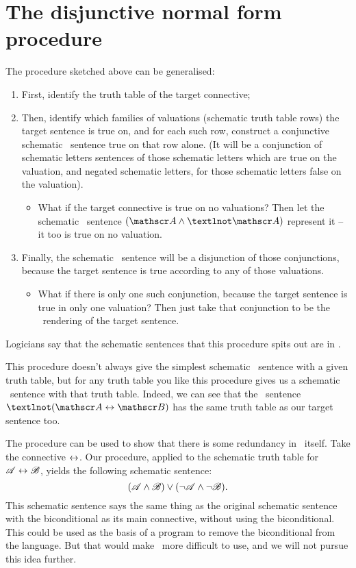 \section{The disjunctive normal form procedure}


The procedure sketched above can be generalised: \begin{enumerate}
	\item First, identify the truth table of the target connective;
	\item Then, identify which families of valuations (schematic truth table rows) the target sentence is true on, and for each such row, construct a conjunctive schematic \TFL\ sentence true on that row alone. (It will be a conjunction of schematic letters sentences of those schematic letters which are true on the valuation, and negated schematic letters, for those schematic letters false on the valuation). \begin{itemize}
		\item What if the target connective is true on no valuations? Then let the schematic \TFL\ sentence $(\meta{A} \wedge ¬\meta{A})$ represent it – it too is true on no valuation.
	\end{itemize}
	\item Finally, the schematic \TFL\ sentence will be a disjunction of those conjunctions, because the target sentence is true according to any of those valuations. \begin{itemize}
		\item What if there is only one such conjunction, because the target sentence is true in only one valuation? Then just take that conjunction to be the \TFL\ rendering of the target sentence.
	\end{itemize}
\end{enumerate}  
Logicians say that the schematic sentences that this procedure spits out are in .


This procedure doesn't always give the simplest schematic \TFL\ sentence with a given truth table, but for any truth table you like this procedure gives us a schematic \TFL\ sentence with that truth table. Indeed, we can see that the \TFL\ sentence $¬(\meta{A} \eiff \meta{B})$ has the same truth table as our target sentence too.

The procedure can be used to show that there is some redundancy in \TFL\ itself. Take the connective $\leftrightarrow$. Our procedure, applied to the schematic truth table for $\mathscr{A}\leftrightarrow\mathscr{B}$, yields the following schematic sentence: \[(\mathscr{A}\wedge\mathscr{B})\vee(\neg\mathscr{A}\wedge\neg\mathscr{B}).\] This schematic sentence says the same thing as the original schematic sentence with the biconditional as its main connective, without using the biconditional. This could be used as the basis of a program to remove the biconditional from the language. But that would make \TFL\ more difficult to use, and we will not pursue this idea further.

